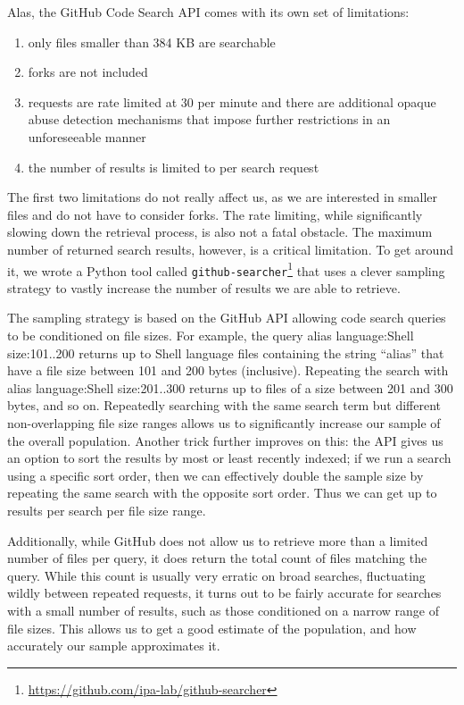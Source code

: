 \documentclass[sigconf,nonacm,screen]{acmart}
\newcommand{\num}[1]{\numprint{#1}}
\newenvironment{CVerbatim}
  {\center\BVerbatim}
  {\endBVerbatim\endcenter}
\begin{document}
Alas, the GitHub Code Search API comes with its own set of limitations:
\begin{enumerate}
    \item only files smaller than 384 KB are searchable
    \item forks are not included
    \item requests are rate limited at 30 per minute and there are additional opaque abuse detection mechanisms that impose further restrictions in an unforeseeable manner
    \item the number of results is limited to \num{1000} per search request
\end{enumerate}
The first two limitations do not really affect us, as we are interested in smaller files and do not have to consider forks.
The rate limiting, while significantly slowing down the retrieval process, is also not a fatal obstacle.
The maximum number of returned search results, however, is a critical limitation.
To get around it, we wrote a Python tool called \verb|github-searcher|\footnote{\url{https://github.com/ipa-lab/github-searcher}} that uses a clever sampling strategy to vastly increase the number of results we are able to retrieve.

The sampling strategy is based on the GitHub API allowing code search queries to be conditioned on file sizes. 
For example, the query 
\begin{CVerbatim}
alias language:Shell size:101..200
\end{CVerbatim}
returns up to \num{1000} Shell language files containing the string ``alias'' that have a file size between 101 and 200 bytes (inclusive).
Repeating the search with 
\begin{CVerbatim}
alias language:Shell size:201..300
\end{CVerbatim}
returns up to \num{1000} files of a size between 201 and 300 bytes, and so on.
Repeatedly searching with the same search term but different non-overlapping file size ranges allows us to significantly increase our sample of the overall population.
Another trick further improves on this: 
the API gives us an option to sort the results by most or least recently indexed;
if we run a search using a specific sort order, then we can effectively double the sample size by repeating the same search with the opposite sort order.
Thus we can get up to \num{2000} results per search per file size range.

Additionally, while GitHub does not allow us to retrieve more than a limited number of files per query, it does return the total count of files matching the query.
While this count is usually very erratic on broad searches, fluctuating wildly between repeated requests, it turns out to be fairly accurate for searches with a small number of results, such as those conditioned on a narrow range of file sizes.
This allows us to get a good estimate of the population, and how accurately our sample approximates it.
\end{document}
